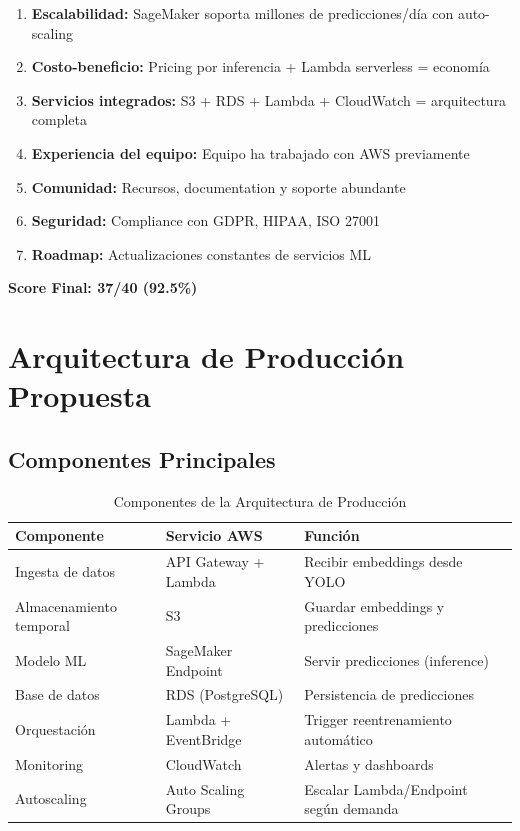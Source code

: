 \documentclass[11pt,letterpaper]{article}
\begin{document}
\begin{enumerate}
  \item \textbf{Escalabilidad:} SageMaker soporta millones de predicciones/día con auto-scaling
  \item \textbf{Costo-beneficio:} Pricing por inferencia + Lambda serverless = economía
  \item \textbf{Servicios integrados:} S3 + RDS + Lambda + CloudWatch = arquitectura completa
  \item \textbf{Experiencia del equipo:} Equipo ha trabajado con AWS previamente
  \item \textbf{Comunidad:} Recursos, documentation y soporte abundante
  \item \textbf{Seguridad:} Compliance con GDPR, HIPAA, ISO 27001
  \item \textbf{Roadmap:} Actualizaciones constantes de servicios ML
\end{enumerate}

\textbf{Score Final: 37/40 (92.5\%)}

\section{Arquitectura de Producción Propuesta}

\subsection{Componentes Principales}

\begin{table}[H]
\centering
\caption{Componentes de la Arquitectura de Producción}
\begin{tabular}{|l|l|p{4cm}|}
\hline
\textbf{Componente} & \textbf{Servicio AWS} & \textbf{Función} \\
\hline
Ingesta de datos & API Gateway + Lambda & Recibir embeddings desde YOLO \\
\hline
Almacenamiento temporal & S3 & Guardar embeddings y predicciones \\
\hline
Modelo ML & SageMaker Endpoint & Servir predicciones (inference) \\
\hline
Base de datos & RDS (PostgreSQL) & Persistencia de predicciones \\
\hline
Orquestación & Lambda + EventBridge & Trigger reentrenamiento automático \\
\hline
Monitoring & CloudWatch & Alertas y dashboards \\
\hline
Autoscaling & Auto Scaling Groups & Escalar Lambda/Endpoint según demanda \\
\hline
\end{tabular}
\end{table}
\end{document}
